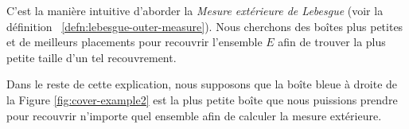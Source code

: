 \documentclass[a4paper]{article}
\begin{document}
C’est la manière intuitive d’aborder la \textit{Mesure extérieure de Lebesgue} (voir la définition ~\ref{defn:lebesgue-outer-measure}). Nous cherchons des boîtes plus petites et de meilleurs placements pour recouvrir l’ensemble $E$ afin de trouver la plus petite taille d’un tel recouvrement.

Dans le reste de cette explication, nous supposons que la boîte bleue à droite de la Figure \ref{fig:cover-example2} est la plus petite boîte que nous puissions prendre pour recouvrir n’importe quel ensemble afin de calculer la mesure extérieure.%
\end{document}
